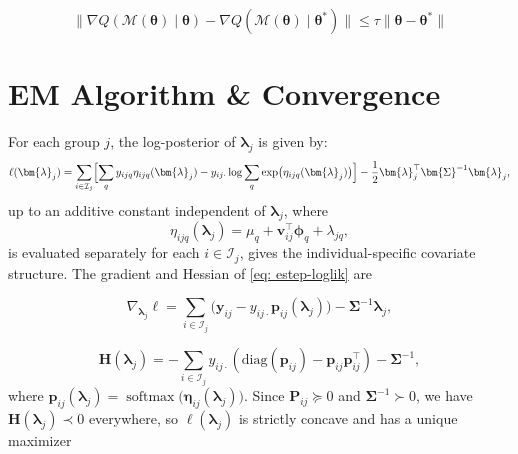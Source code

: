 \begin{condition}
    \begin{equation}
        \| \nabla Q(\mathcal{M}(\bm{\theta})\mid \bm{\theta})-\nabla Q(\mathcal{M}(\bm{\theta})\mid \bm{\theta}^{*})\|\leq \tau \|\bm{\theta}-\bm{\theta}^{*}\|
    \end{equation}
\end{condition}
\fi

\section{EM Algorithm \& Convergence}
\label{sec: EM}
    For each group $j$, the log-posterior of $\bm{\lambda}_{j}$ is given by:
\begin{equation}
    \ell(\bm{\lambda}_{j})=\sum_{i\in \mathcal{I}_{j}}\Bigl[\sum_{q}y_{ijq}\eta_{ijq}(\bm{\lambda}_{j})-y_{ij\cdot}\log \sum_{q}\exp\bigl(\eta_{ijq}(\bm{\lambda}_{j})\bigr)\Bigr]-\frac{1}{2}\bm{\lambda}_{j}^{\top}\bm{\Sigma}^{-1}\bm{\lambda}_{j},
    \label{eq: estep-loglik}
\end{equation}
up to an additive constant independent of $\bm{\lambda}_{j}$, where 
\begin{equation}
    \eta_{ijq}(\bm{\lambda}_{j})=\mu_{q}+\bm{v}_{ij}^{\top}\bm{\phi}_{q}+\lambda_{jq},
    \label{eq: individualcovariate}
\end{equation}
is evaluated separately for each $i\in \mathcal{I}_{j}$, gives the individual-specific covariate structure.
The gradient and Hessian of \eqref{eq: estep-loglik} are

\begin{equation}
    \nabla_{\bm{\lambda}_{j}}\ell=\sum_{i\in \mathcal{I}_{j}}\bigl(\bm{y}_{ij}-y_{ij\cdot}\bm{p}_{ij}(\bm{\lambda}_{j})\bigr)-\bm{\Sigma}^{-1}\bm{\lambda}_{j},
\end{equation}

\begin{equation}
    \mathbf{H}(\bm{\lambda}_{j})=-\sum_{i\in\mathcal{I}_{j}}y_{ij\cdot}\left(\text{diag}(\bm{p}_{ij})-\bm{p}_{ij}\bm{p}_{ij}^{\top}\right)-\bm{\Sigma}^{-1},
    \label{eq: hessian-equality}
\end{equation}
where $\bm{p}_{ij}(\bm{\lambda}_{j})=\operatorname{softmax}\bigl(\bm{\eta}_{ij}(\bm{\lambda}_{j})\bigr)$. Since $\mathbf{P}_{ij}\succeq 0$ and $\bm{\Sigma}^{-1}\succ 0$, we have $\mathbf{H}(\bm{\lambda}_{j})\prec 0$ everywhere, so $\ell(\bm{\lambda}_{j})$ is strictly concave and has a unique maximizer

